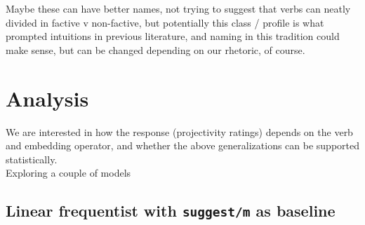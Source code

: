\documentclass[10pt]{article}\usepackage[]{graphicx}\usepackage[]{color}
\begin{document}
Maybe these can have better names, not trying to suggest that verbs can neatly divided in factive v non-factive, but potentially this class / profile is what prompted intuitions in previous literature, and naming in this tradition could make sense, but can be changed depending on our rhetoric, of course.

\section{Analysis}

We are interested in how the response (projectivity ratings) depends on the verb and embedding operator, and whether the above generalizations can be supported statistically.\\

Exploring a couple of models

\subsection{Linear frequentist with \texttt{suggest/m} as baseline}
\end{document}
